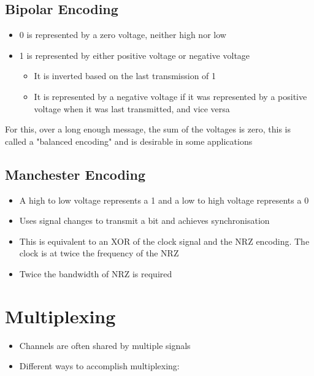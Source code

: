 \documentclass{article}[18pt]
\begin{document}
\subsection{Bipolar Encoding}
\begin{defin}
\begin{itemize}
	\item 0 is represented by a zero voltage, neither high nor low
	\item 1 is represented by either positive voltage or negative voltage
	\begin{itemize}
		\item It is inverted based on the last transmission of 1
		\item It is represented by a negative voltage if it was represented by a positive voltage when it was last transmitted, and vice versa
	\end{itemize}
\end{itemize}
\end{defin}
For this, over a long enough message, the sum of the voltages is zero, this is called a "balanced encoding" and is desirable in some applications

\subsection{Manchester Encoding}
\begin{defin}
\begin{itemize}
	\item A high to low voltage represents a 1 and a low to high voltage represents a 0
	\item Uses signal changes to transmit a bit and achieves synchronisation
	\item This is equivalent to an XOR of the clock signal and the NRZ encoding. The clock is at twice the frequency of the NRZ
\end{itemize}
\end{defin}
\begin{itemize}
	\item Twice the bandwidth of NRZ is required
\end{itemize}
\section{Multiplexing}
\begin{itemize}
	\item Channels are often shared by multiple signals
	\item Different ways to accomplish multiplexing:
\end{itemize}
\end{document}
